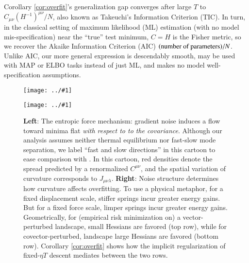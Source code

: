 \documentclass{article}
\newcommand{\plotmooh}[3]{
    \texttt{[image: ../\#1]}
}
\begin{document}
        Corollary \ref{cor:overfit}'s generalization gap converges after
        large $T$ to $C_{\mu\nu}(H^{-1})^{\mu\nu}/N$, also known as Takeuchi's
        Information Criterion (TIC).  In turn, in the classical setting of
        maximum likelihood (ML) estimation (with no model mis-specification)
        near the ``true'' test minimum, $C=H$ is the Fisher metric, so we
        recover the Akaike Information Criterion (AIC) $(\textnormal{number of
        parameters})/N$.  Unlike AIC, our more general expression is
        descendably smooth, may be used with MAP or ELBO tasks instead of just
        ML, and makes no model well-specification assumptions.

        \begin{figure}[h!]
            \centering
            \plotmooh{diagrams/entropic-force-diagram}{}{0.35\columnwidth} 
            \plotmooh{diagrams/springs}{}{0.35\columnwidth}
            \caption{
                {\bf Left}:
                    The entropic force mechanism: gradient noise induces a flow
                    toward minima flat \emph{with respect to to the
                    covariance}.  Although our analysis assumes neither thermal
                    equilibrium nor fast-slow mode separation, we label ``fast
                    and slow directions'' in this cartoon to ease comparison
                    with \citet{we19b}.  In this cartoon, red densities denote
                    the spread predicted by a renormalized $C^{\mu\nu}$, and
                    the spatial variation of curvature corresponds to
                    $J_{\mu\nu\lambda}$. 
                {\bf Right}:
                    Noise structure determines how curvature affects
                    overfitting.  To use a physical metaphor, for a fixed
                    displacement scale, stiffer springs incur greater energy
                    gains.  But for a fixed force scale, limper springs incur
                    greater energy gains.  Geometrically, for (empirical risk
                    minimization on) a vector-perturbed landscape, small
                    Hessians are favored (top row), while for
                    covector-perturbed, landscape large Hessians are favored
                    (bottom row).  Corollary \ref{cor:overfit} shows how the
                    implicit regularization of fixed-$\eta T$ descent mediates
                    between the two rows.
            }
            \label{fig:entropic}
        \end{figure}
\end{document}

